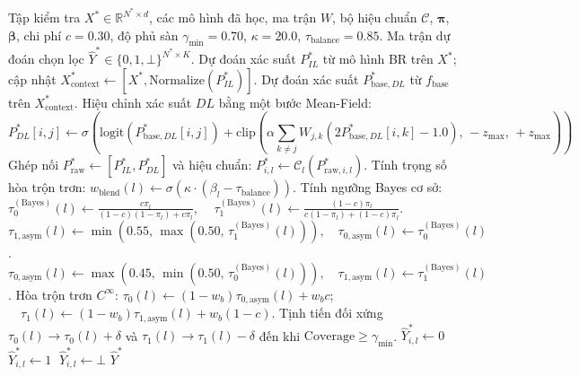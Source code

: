 \documentclass[10pt,a4paper,twoside]{article}
\begin{document}
\begin{algorithm}[H]
\caption{Giai Đoạn 3: Suy Diễn Ba Chế Độ Thích Ứng \& Chốt Chặn Bảo Vệ}
\label{alg:inference}
\begin{algorithmic}[1]
\Require Tập kiểm tra $X^* \in \mathbb{R}^{N^* \times d}$, các mô hình đã học, ma trận $W$, bộ hiệu chuẩn $\mathcal{C}$, $\boldsymbol{\pi}$, $\boldsymbol{\beta}$, chi phí $c=0.30$, độ phủ sàn $\gamma_{\min}=0.70$, $\kappa=20.0$, $\tau_{\text{balance}}=0.85$.
\Ensure Ma trận dự đoán chọn lọc $\hat{Y}^* \in \{0, 1, \bot\}^{N^* \times K}$.
\State Dự đoán xác suất $P^*_{IL}$ từ mô hình BR trên $X^*$; cập nhật $X^*_{\text{context}} \gets [X^*, \text{Normalize}(P^*_{IL})]$.
\State Dự đoán xác suất $P^*_{\text{base}, DL}$ từ $f_{\text{base}}$ trên $X^*_{\text{context}}$.
\State Hiệu chỉnh xác suất $DL$ bằng một bước Mean-Field:
      $$P^*_{DL}[i, j] \gets \sigma\left(\text{logit}(P^*_{\text{base}, DL}[i, j]) + \text{clip}\left(\alpha \sum_{k \neq j} W_{j, k} (2 P^*_{\text{base}, DL}[i, k] - 1.0), \, -z_{\max}, \, +z_{\max}\right)\right)$$
\State Ghép nối $P^*_{\text{raw}} \gets [P^*_{IL}, P^*_{DL}]$ và hiệu chuẩn: $P^*_{i, l} \gets \mathcal{C}_l(P^*_{\text{raw}, i, l})$.
    \State Tính trọng số hòa trộn trơn: $w_{\text{blend}}(l) \gets \sigma\left(\kappa \cdot (\beta_l - \tau_{\text{balance}})\right)$.
    \State Tính ngưỡng Bayes cơ sở: $\tau_0^{(\text{Bayes})}(l) \gets \frac{c \pi_l}{(1-c)(1-\pi_l) + c \pi_l}$, $\quad \tau_1^{(\text{Bayes})}(l) \gets \frac{(1-c)\pi_l}{c(1-\pi_l) + (1-c)\pi_l}$.
     
        \State $\tau_{1,\text{asym}}(l) \gets \min\left(0.55, \, \max\left(0.50, \, \tau_1^{(\text{Bayes})}(l)\right)\right), \quad \tau_{0,\text{asym}}(l) \gets \tau_0^{(\text{Bayes})}(l)$.
    \Else {}
        \State $\tau_{0,\text{asym}}(l) \gets \max\left(0.45, \, \min\left(0.50, \, \tau_0^{(\text{Bayes})}(l)\right)\right), \quad \tau_{1,\text{asym}}(l) \gets \tau_1^{(\text{Bayes})}(l)$.
    \EndIf
    \State Hòa trộn trơn $C^\infty$: $\tau_0(l) \gets (1 - w_b)\tau_{0,\text{asym}}(l) + w_b c$; $\quad \tau_1(l) \gets (1 - w_b)\tau_{1,\text{asym}}(l) + w_b (1 - c)$.
\EndFor
{} 
    \State Tịnh tiến đối xứng $\tau_0(l) \to \tau_0(l) + \delta$ và $\tau_1(l) \to \tau_1(l) - \delta$ đến khi $\text{Coverage} \ge \gamma_{\min}$.
\EndIf
{}
     $\hat{Y}^*_{i, l} \gets 0$ 
     $\hat{Y}^*_{i, l} \gets 1$ 
    \Else $\; \hat{Y}^*_{i, l} \gets \bot$  \EndIf
\EndFor
\State \Return $\hat{Y}^*$
\end{algorithmic}
\end{algorithm}
\end{document}
